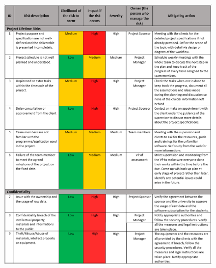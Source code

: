\begin{figure}[ht]
    \centering
    \includegraphics[width=1\textwidth]{images/Risk_1.PNG}
\end{figure}
 
